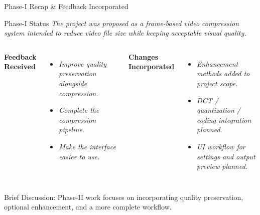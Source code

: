 \documentclass[aspectratio=169,11pt]{beamer}
\newcommand{\smallnote}[1]{%
\vspace{0.08cm}
{\scriptsize\color{GEUGrey}#1}
}
\newcommand{\placeholder}[1]{%
\textit{\color{GEUGrey}#1}
}
\begin{document}
\begin{frame}{Phase-I Recap \& Feedback Incorporated}
\scriptsize

\begin{block}{Phase-I Status}
\placeholder{
The project was proposed as a frame-based video compression system intended to reduce video file size while keeping acceptable visual quality.
}
\end{block}

\vspace{2mm}

\begin{columns}[T,totalwidth=\textwidth]


\textbf{\color{GEUBlue}Feedback Received}
\begin{itemize}\itemsep2pt
\item \placeholder{ Improve quality preservation alongside compression.}
\item \placeholder{Complete the compression pipeline.}
\item \placeholder{Make the interface easier to use.}
\end{itemize}


\textbf{\color{GEUBlue}Changes Incorporated}

\begin{itemize}\itemsep2pt
\item \placeholder{Enhancement methods added to project scope.}
\item \placeholder{DCT / quantization / coding integration planned.}
\item \placeholder{UI workflow for settings and output preview planned.}
\end{itemize}

\end{columns}

\smallnote{
Brief Discussion:  Phase-II work focuses on incorporating quality preservation, optional enhancement, and a more complete workflow.
}

\end{frame}
\end{document}
